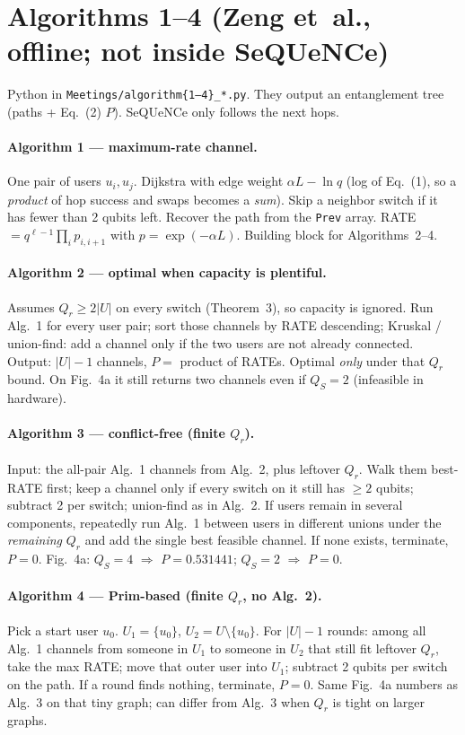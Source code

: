 \documentclass[11pt]{article}
\begin{document}
\section{Algorithms 1--4 (Zeng et~al., offline; not inside SeQUeNCe)}

Python in \texttt{Meetings/algorithm\{1--4\}\_*.py}.
They output an entanglement tree (paths + Eq.~(2) $P$).
SeQUeNCe only follows the next hops.

\paragraph{Algorithm 1 --- maximum-rate channel.}
One pair of users $u_i,u_j$.
Dijkstra with edge weight $\alpha L-\ln q$ (log of Eq.~(1), so a \emph{product} of hop success and swaps becomes a \emph{sum}).
Skip a neighbor switch if it has fewer than 2 qubits left.
Recover the path from the \texttt{Prev} array.
RATE $= q^{\ell-1}\prod_i p_{i,i+1}$ with $p=\exp(-\alpha L)$.
Building block for Algorithms~2--4.

\paragraph{Algorithm 2 --- optimal when capacity is plentiful.}
Assumes $Q_r\ge 2|U|$ on every switch (Theorem~3), so capacity is ignored.
Run Alg.~1 for every user pair; sort those channels by RATE descending; Kruskal / union-find: add a channel only if the two users are not already connected.
Output: $|U|-1$ channels, $P=$ product of RATEs.
Optimal \emph{only} under that $Q_r$ bound.
On Fig.~4a it still returns two channels even if $Q_S=2$ (infeasible in hardware).

\paragraph{Algorithm 3 --- conflict-free (finite $Q_r$).}
Input: the all-pair Alg.~1 channels from Alg.~2, plus leftover $Q_r$.
Walk them best-RATE first; keep a channel only if every switch on it still has $\ge 2$ qubits; subtract 2 per switch; union-find as in Alg.~2.
If users remain in several components, repeatedly run Alg.~1 between users in different unions under the \emph{remaining} $Q_r$ and add the single best feasible channel.
If none exists, terminate, $P=0$.
Fig.~4a: $Q_S=4$ $\Rightarrow$ $P=0.531441$; $Q_S=2$ $\Rightarrow$ $P=0$.

\paragraph{Algorithm 4 --- Prim-based (finite $Q_r$, no Alg.~2).}
Pick a start user $u_0$.
$U_1=\{u_0\}$, $U_2=U\setminus\{u_0\}$.
For $|U|-1$ rounds: among all Alg.~1 channels from someone in $U_1$ to someone in $U_2$ that still fit leftover $Q_r$, take the max RATE; move that outer user into $U_1$; subtract 2 qubits per switch on the path.
If a round finds nothing, terminate, $P=0$.
Same Fig.~4a numbers as Alg.~3 on that tiny graph; can differ from Alg.~3 when $Q_r$ is tight on larger graphs.
\end{document}
